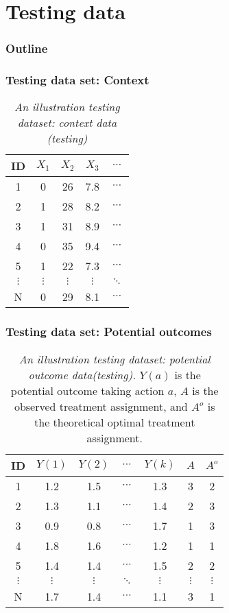 \documentclass{beamer}
\begin{document}
\section{Testing data}
\begin{frame}
	\frametitle{Outline}
	\tableofcontents[current]
\end{frame}

\begin{frame}
	\frametitle{Testing data set: Context}
\begin{table}[htbp]
	\centering
	\caption{\emph{An illustration testing dataset: context data (testing)} }
	\begin{tabular}{c|cccc}
		\hline
		\hline
		ID &  $X_1$    & $X_2$    & $X_3$    & $\cdots$ \\
		\hline
		1& 0     & 26    & 7.8   & $\cdots$ \\
		2& 1     & 28    & 8.2   & $\cdots$  \\
		3& 1     & 31    & 8.9   & $\cdots$  \\
		4& 0     & 35    & 9.4   & $\cdots$  \\
		5& 1     & 22    & 7.3   & $\cdots$  \\
		$\vdots$ &  $\vdots$   & $\vdots$     & $\vdots$     & $\ddots$  \\
		N &  0 & 29 & 8.1 & $\cdots$ \\
		\hline
		\hline
	\end{tabular}%
	\label{tab:TestingDataExample1}%
\end{table}
\end{frame}


\begin{frame}
	\frametitle{Testing data set: Potential outcomes}
	
\begin{table}[htbp]
	\centering
	\caption{\emph{An illustration testing dataset: potential outcome data(testing).} $Y(a)$ is the potential outcome taking action $a$, $A$ is the observed treatment assignment, and $A^o$ is the theoretical optimal treatment assignment.}
	\begin{tabular}{c|cccc|cc}
		\hline
		\hline
		ID &  $Y(1)$    & $Y(2)$    & $\cdots$  & $Y(k)$ & $A$ & $A^o$   \\
		\hline
		1& 1.2    & 1.5    &  $\cdots$  & 1.3 & 3 & 2 \\
		2& 1.3    & 1.1    &  $\cdots$  & 1.4 & 2 & 3 \\
		3& 0.9    & 0.8    &  $\cdots$  & 1.7 & 1 & 3 \\
		4& 1.8    & 1.6    &  $\cdots$  & 1.2 & 1 & 1 \\
		5& 1.4    & 1.4    &  $\cdots$  & 1.5 & 2 & 2 \\
		$\vdots$ &  $\vdots$   & $\vdots$     & $\ddots$     & $\vdots$ &  $\vdots$   & $\vdots$ \\
		N & 1.7    & 1.4    &  $\cdots$  & 1.1 & 3 & 1 \\
		\hline
		\hline
	\end{tabular}%
	\label{tab:TestingDataExample2}%
\end{table}
	
\end{frame}
\end{document}
